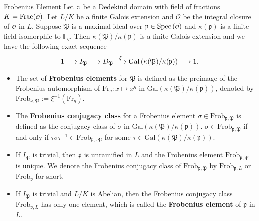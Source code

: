\begin{definition}{Frobenius Element}{}
    Let $\mathcalo$ be a Dedekind domain with field of fractions $K=\mathrm{Frac}(\mathcalo)$. Let $L/K$ be a finite Galois extension and $\mathcal{O}$ be the integral closure of $\mathcalo$ in $L$. Suppose $\mathfrak{P}$ is a maximal ideal over $\mathfrak{p}\in \spec\left(\mathcalo\right)$ and $\kappa(\mathfrak{p})$ is a finite field isomorphic to $\mathbb{F}_{q}$. Then $\kappa(\mathfrak{P})/\kappa(\mathfrak{p})$ is a finite Galois extension and we have the following exact sequence
    \[
    1\longrightarrow I_{\mathfrak{P}}\longrightarrow D_{\mathfrak{P}}\xlongrightarrow{\xi} \mathrm{Gal}\left(\kappa(\mathfrak{P})/\kappa(\mathfrak{p})\right)\longrightarrow 1.
    \]
    \begin{itemize}
        \item The set of \textbf{Frobenius elements} for $\mathfrak{P}$ is defined as the preimage of the Frobenius automorphism of $\mathrm{Fr}_q:x\mapsto x^q$ in $\mathrm{Gal}\left(\kappa(\mathfrak{P})/\kappa(\mathfrak{p})\right)$, denoted by $\mathrm{Frob}_{\mathfrak{p},\mathfrak{P}}:=\xi^{-1}\left(\mathrm{Fr}_q\right)$.
        \item The \textbf{Frobenius conjugacy class} for a Frobenius element $\sigma\in \mathrm{Frob}_{\mathfrak{p},\mathfrak{P}}$ is defined as the conjugacy class of $\sigma$ in $\mathrm{Gal}(\kappa(\mathfrak{P})/\kappa(\mathfrak{p}))$. $\sigma \in \mathrm{Frob}_{\mathfrak{p},\mathfrak{P}}$ if and only if $\tau \sigma \tau^{-1}\in  \mathrm{Frob}_{\mathfrak{p},\tau \mathfrak{P}}$ for some $\tau\in \mathrm{Gal}(\kappa(\mathfrak{P})/\kappa(\mathfrak{p}))$.
        \item If $I_{\mathfrak{P}}$ is trivial, then $\mathfrak{p}$ is unramified in $L$ and the Frobenius element $\mathrm{Frob}_{\mathfrak{p},\mathfrak{P}}$ is unique. We denote the Frobenius conjugacy class of $\mathrm{Frob}_{\mathfrak{p},\mathfrak{P}}$ by $\mathrm{Frob}_{\mathfrak{p}, L}$ or $\mathrm{Frob}_{\mathfrak{p}}$ for short.
        \item If $I_{\mathfrak{P}}$ is trivial and $L/K$ is Abelian, then the Frobenius conjugacy class $\mathrm{Frob}_{\mathfrak{p}, L}$ has only one element, which is called the \textbf{Frobenius element} of $\mathfrak{p}$ in $L$.
    \end{itemize}
    
\end{definition}


